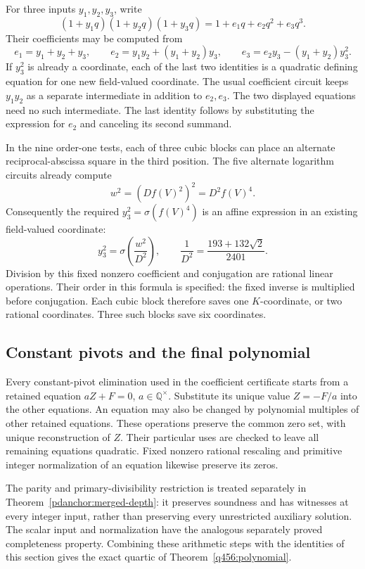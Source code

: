 \documentclass[11pt,a4paper]{article}
\theoremstyle{definition}
\theoremstyle{remark}
\begin{document}
For three inputs $y_1,y_2,y_3$, write
\[
 (1+y_1q)(1+y_2q)(1+y_3q)=1+e_1q+e_2q^2+e_3q^3.
\]
Their coefficients may be computed from
\[
 e_1=y_1+y_2+y_3,\qquad
 e_2=y_1y_2+(y_1+y_2)y_3,\qquad
 e_3=e_2y_3-(y_1+y_2)y_3^2.
\]
If $y_3^2$ is already a coordinate, each of the last two
identities is a quadratic defining equation for one new
field-valued coordinate. The usual coefficient circuit keeps
$y_1y_2$ as a separate intermediate in addition to $e_2,e_3$.
The two displayed equations need no such intermediate. The last
identity follows by substituting the expression for $e_2$ and
canceling its second summand.

In the nine order-one tests, each of three cubic blocks can place
an alternate reciprocal-abscissa square in the third position.
The five alternate logarithm circuits already compute
\[
              w^2=(Df(V)^2)^2=D^2 f(V)^4.
\]
Consequently the required $y_3^2=\sigma(f(V)^4)$ is an affine
expression in an existing field-valued coordinate:
\[
 y_3^2=\sigma\left(\frac{w^2}{D^2}\right),\qquad
 \frac1{D^2}=\frac{193+132\sqrt2}{2401}.
\]
Division by this fixed nonzero coefficient and conjugation are
rational linear operations. Their order in this formula is
specified: the fixed inverse is multiplied before conjugation.
Each cubic block therefore saves one $K$-coordinate, or two
rational coordinates. Three such blocks save six coordinates.

\subsection{Constant pivots and the final polynomial}

Every constant-pivot elimination used in the coefficient certificate
starts from a retained equation $aZ+F=0$, $a\in\mathbb Q^\times$.
Substitute its unique value $Z=-F/a$ into the other equations.
An equation may also be changed by polynomial multiples of other
retained equations. These operations preserve the common zero
set, with unique reconstruction of $Z$. Their particular uses
are checked to leave all remaining equations quadratic.
Fixed nonzero rational rescaling and primitive integer
normalization of an equation likewise preserve its zeros.

The parity and primary-divisibility restriction is treated
separately in Theorem~\ref{pdanchor:merged-depth}: it preserves
soundness and has witnesses at every integer input, rather than
preserving every unrestricted auxiliary solution. The scalar
input and normalization have the analogous separately proved
completeness property. Combining these arithmetic steps with the
identities of this section gives the exact quartic of
Theorem~\ref{q456:polynomial}.
\end{document}
